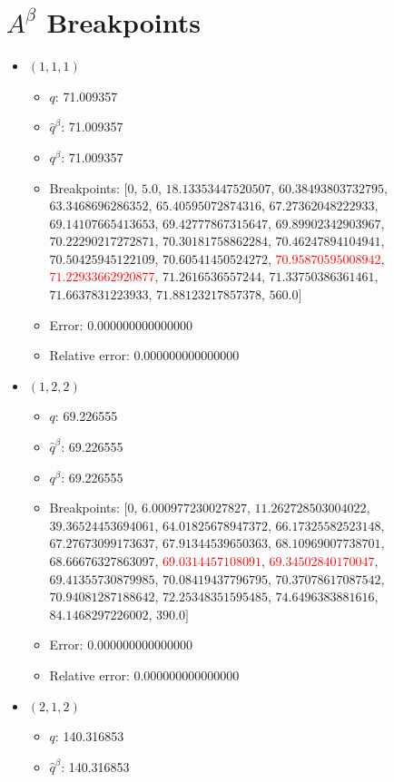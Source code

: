 \documentclass{article}%
\begin{document}
\section{$A^\beta$ Breakpoints}%
\thispagestyle{plain}%
\begin{itemize}%
	\item $(1, 1, 1)$%
	\begin{itemize}%
		\item $q$: 71.009357%
		\item $\hat{q}^\beta$: 71.009357%
		\item $q^\beta$: 71.009357%
		\item Breakpoints: $[$$0$, $5.0$, $18.13353447520507$, $60.38493803732795$, $63.3468696286352$, $65.40595072874316$, $67.27362048222933$, $69.14107665413653$, $69.42777867315647$, $69.89902342903967$, $70.22290217272871$, $70.30181758862284$, $70.46247894104941$, $70.50425945122109$, $70.60541450524272$, \textcolor{red}{$70.95870595008942$}, \textcolor{red}{$71.22933662920877$}, $71.2616536557244$, $71.33750386361461$, $71.6637831223933$, $71.88123217857378$, $560.0$$]$%
		\item Error: 0.000000000000000%
		\item Relative error: 0.000000000000000%
	\end{itemize}%
	\item $(1, 2, 2)$%
	\begin{itemize}%
		\item $q$: 69.226555%
		\item $\hat{q}^\beta$: 69.226555%
		\item $q^\beta$: 69.226555%
		\item Breakpoints: $[$$0$, $6.000977230027827$, $11.262728503004022$, $39.36524453694061$, $64.01825678947372$, $66.17325582523148$, $67.27673099173637$, $67.91344539650363$, $68.10969007738701$, $68.66676327863097$, \textcolor{red}{$69.0314457108091$}, \textcolor{red}{$69.34502840170047$}, $69.41355730879985$, $70.08419437796795$, $70.37078617087542$, $70.94081287188642$, $72.25348351595485$, $74.6496383881616$, $84.1468297226002$, $390.0$$]$%
		\item Error: 0.000000000000000%
		\item Relative error: 0.000000000000000%
	\end{itemize}%
	\item $(2, 1, 2)$%
	\begin{itemize}%
		\item $q$: 140.316853%
		\item $\hat{q}^\beta$: 140.316853%

\end{itemize}
\end{itemize}
\end{document}
